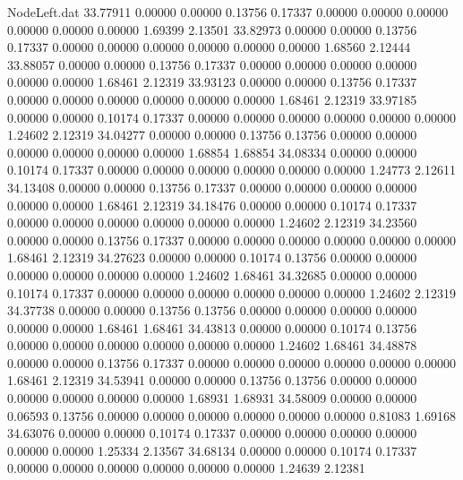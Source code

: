 \begin{filecontents}{NodeLeft.dat}
  33.77911    0.00000    0.00000     0.13756    0.17337    0.00000    0.00000    0.00000    0.00000    0.00000    0.00000    1.69399    2.13501
  33.82973    0.00000    0.00000     0.13756    0.17337    0.00000    0.00000    0.00000    0.00000    0.00000    0.00000    1.68560    2.12444
  33.88057    0.00000    0.00000     0.13756    0.17337    0.00000    0.00000    0.00000    0.00000    0.00000    0.00000    1.68461    2.12319
  33.93123    0.00000    0.00000     0.13756    0.17337    0.00000    0.00000    0.00000    0.00000    0.00000    0.00000    1.68461    2.12319
  33.97185    0.00000    0.00000     0.10174    0.17337    0.00000    0.00000    0.00000    0.00000    0.00000    0.00000    1.24602    2.12319
  34.04277    0.00000    0.00000     0.13756    0.13756    0.00000    0.00000    0.00000    0.00000    0.00000    0.00000    1.68854    1.68854
  34.08334    0.00000    0.00000     0.10174    0.17337    0.00000    0.00000    0.00000    0.00000    0.00000    0.00000    1.24773    2.12611
  34.13408    0.00000    0.00000     0.13756    0.17337    0.00000    0.00000    0.00000    0.00000    0.00000    0.00000    1.68461    2.12319
  34.18476    0.00000    0.00000     0.10174    0.17337    0.00000    0.00000    0.00000    0.00000    0.00000    0.00000    1.24602    2.12319
  34.23560    0.00000    0.00000     0.13756    0.17337    0.00000    0.00000    0.00000    0.00000    0.00000    0.00000    1.68461    2.12319
  34.27623    0.00000    0.00000     0.10174    0.13756    0.00000    0.00000    0.00000    0.00000    0.00000    0.00000    1.24602    1.68461
  34.32685    0.00000    0.00000     0.10174    0.17337    0.00000    0.00000    0.00000    0.00000    0.00000    0.00000    1.24602    2.12319
  34.37738    0.00000    0.00000     0.13756    0.13756    0.00000    0.00000    0.00000    0.00000    0.00000    0.00000    1.68461    1.68461
  34.43813    0.00000    0.00000     0.10174    0.13756    0.00000    0.00000    0.00000    0.00000    0.00000    0.00000    1.24602    1.68461
  34.48878    0.00000    0.00000     0.13756    0.17337    0.00000    0.00000    0.00000    0.00000    0.00000    0.00000    1.68461    2.12319
  34.53941    0.00000    0.00000     0.13756    0.13756    0.00000    0.00000    0.00000    0.00000    0.00000    0.00000    1.68931    1.68931
  34.58009    0.00000    0.00000     0.06593    0.13756    0.00000    0.00000    0.00000    0.00000    0.00000    0.00000    0.81083    1.69168
  34.63076    0.00000    0.00000     0.10174    0.17337    0.00000    0.00000    0.00000    0.00000    0.00000    0.00000    1.25334    2.13567
  34.68134    0.00000    0.00000     0.10174    0.17337    0.00000    0.00000    0.00000    0.00000    0.00000    0.00000    1.24639    2.12381

\end{filecontents}

